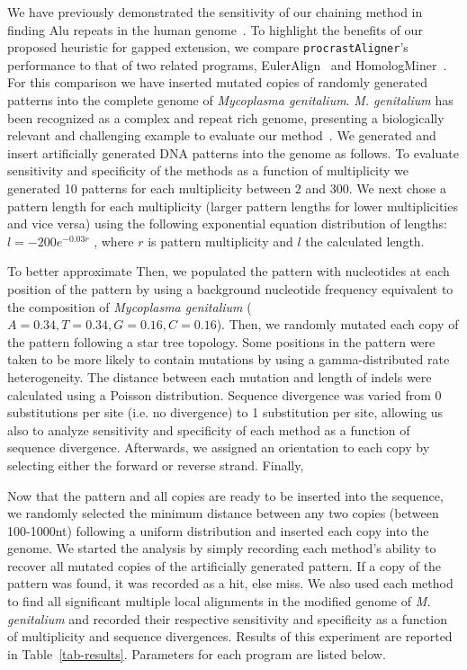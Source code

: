 \documentclass[twoside,11pt]{article}
\begin{document}
We have previously demonstrated the sensitivity of our chaining method in finding Alu repeats in
the human genome~\cite{ref-procrast}. To highlight the benefits of our proposed heuristic for gapped extension, we compare \texttt{procrastAligner}'s performance to that of two related programs, EulerAlign~\cite{ref-related1} and HomologMiner~\cite{ref-homologminer}. For this comparison we have inserted mutated copies of randomly generated patterns into the complete genome of \emph{Mycoplasma genitalium}. \emph{M. genitalium} has been recognized as a complex and repeat rich genome, presenting a biologically relevant and challenging example to evaluate our method~\cite{ref-mycoplasma}. We generated and insert artificially generated DNA patterns into the genome as follows. To evaluate sensitivity and specificity of the methods as a function of multiplicity we generated 10 patterns for each multiplicity between 2 and 300. We next chose a pattern length for each multiplicity (larger pattern lengths for lower multiplicities and vice versa) using the following exponential equation distribution of lengths: $l = -200e^{-0.03r}$ , where $r$ is pattern multiplicity and $l$ the calculated length.

To better approximate Then, we populated the pattern with nucleotides at each position of the pattern by using a background nucleotide frequency equivalent to the composition of \emph{Mycoplasma genitalium} ($A=0.34,T=0.34,G=0.16,C=0.16$). Then, we randomly mutated each copy of the pattern following a star tree topology. Some positions in the pattern were taken to be more likely to contain mutations by using a gamma-distributed rate heterogeneity. The distance between each mutation and length of indels were calculated using a Poisson distribution. Sequence divergence was varied from 0 substitutions per site (i.e. no divergence) to 1 substitution per site, allowing us also to analyze sensitivity and specificity of each method as a function of sequence divergence. Afterwards, we assigned an orientation to each copy by selecting either the forward or reverse strand.
Finally,

Now that the pattern and all copies are ready to be inserted into the sequence, we randomly selected the minimum distance between any two copies (between 100-1000nt) following a uniform distribution and inserted each copy into the genome.  We started the analysis by simply recording each method's ability to recover all mutated copies of the  artificially generated pattern. If a copy of the pattern was found, it was recorded as a hit, else miss. We also used each method to find all significant multiple local alignments in the modified genome of \emph{M. genitalium} and recorded their respective sensitivity and specificity as a function of multiplicity and sequence divergences. Results of this experiment are reported in Table~\ref{tab-results}. Parameters for each program are listed below.
\end{document}
